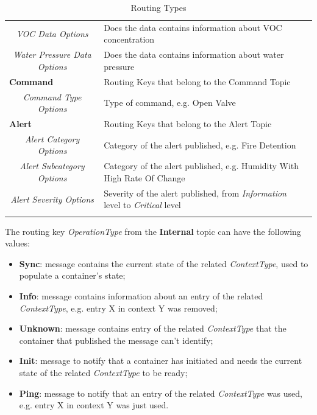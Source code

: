 \begin{landscape}
\begin{longtable}{cll}
   \textit{VOC Data Options}               & Does the data contains information about VOC concentration\footnotemark[1]\footnotemark[2]                &  \\
   \textit{Water Pressure Data Options}    & Does the data contains information about water pressure\footnotemark[1]\footnotemark[2]                   &  \\ \cline{1-2}
   \multicolumn{1}{l}{\textbf{Command}}    & Routing Keys that belong to the Command Topic                                                             &  \\
   \textit{Command Type Options}           & Type of command, e.g. Open Valve                                                                          &  \\ \cline{1-2}
   \multicolumn{1}{l}{\textbf{Alert}}      & Routing Keys that belong to the Alert Topic                                                               &  \\
   \textit{Alert Category Options}         & Category of the alert published, e.g. Fire Detention                                                      &  \\
   \textit{Alert Subcategory Options}      & Category of the alert published, e.g. Humidity With High Rate Of Change                                   &  \\
   \textit{Alert Severity Options}         & Severity of the alert published, from \textit{Information} level to \textit{Critical} level               &  \\ \cline{1-2}
   \caption{Routing Types}
   \label{tab:design:domain:shared_model:routing}\\
   \end{longtable}
\end{landscape}

The routing key \textit{OperationType} from the \textbf{Internal} topic can have the following values:

\begin{itemize}
   \item \textbf{Sync}: message contains the current state of the related \textit{ContextType}, used to populate a container's state;
   \item \textbf{Info}: message contains information about an entry of the related \textit{ContextType}, e.g. entry X in context Y was removed;
   \item \textbf{Unknown}: message contains entry of the related \textit{ContextType} that the container that published the message can't identify;
   \item \textbf{Init}: message to notify that a container has initiated and needs the current state of the related \textit{ContextType} to be ready;
   \item \textbf{Ping}: message to notify that an entry of the related \textit{ContextType} was used, e.g. entry X in context Y was just used.
\end{itemize}

